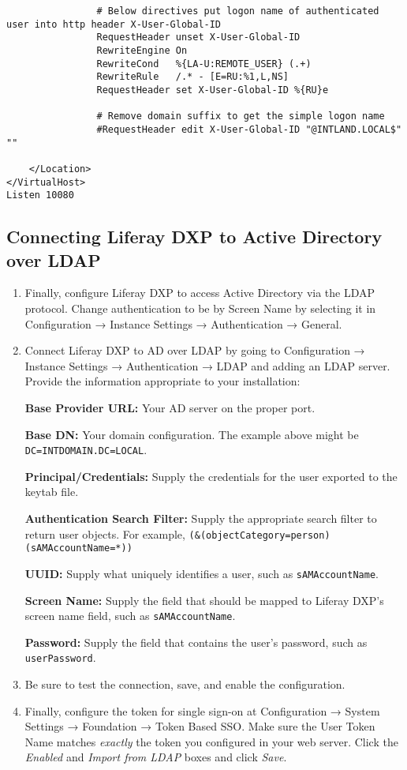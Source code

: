 \begin{enumerate}
\begin{verbatim}
                # Below directives put logon name of authenticated user into http header X-User-Global-ID
                RequestHeader unset X-User-Global-ID
                RewriteEngine On
                RewriteCond   %{LA-U:REMOTE_USER} (.+)
                RewriteRule   /.* - [E=RU:%1,L,NS]
                RequestHeader set X-User-Global-ID %{RU}e

                # Remove domain suffix to get the simple logon name
                #RequestHeader edit X-User-Global-ID "@INTLAND.LOCAL$" ""

    </Location>
</VirtualHost>
Listen 10080
\end{verbatim}
\end{enumerate}

\subsection{Connecting Liferay DXP to Active Directory over
LDAP}\label{connecting-liferay-dxp-to-active-directory-over-ldap}

\begin{enumerate}
\def\labelenumi{\arabic{enumi}.}
\item
  Finally, configure Liferay DXP to access Active Directory via the LDAP
  protocol. Change authentication to be by Screen Name by selecting it
  in Configuration → Instance Settings → Authentication → General.
\item
  Connect Liferay DXP to AD over LDAP by going to Configuration →
  Instance Settings → Authentication → LDAP and adding an LDAP server.
  Provide the information appropriate to your installation:

  \textbf{Base Provider URL:} Your AD server on the proper port.

  \textbf{Base DN:} Your domain configuration. The example above might
  be \texttt{DC=INTDOMAIN.DC=LOCAL}.

  \textbf{Principal/Credentials:} Supply the credentials for the user
  exported to the keytab file.

  \textbf{Authentication Search Filter:} Supply the appropriate search
  filter to return user objects. For example,
  \texttt{(\&(objectCategory=person)(sAMAccountName=*))}

  \textbf{UUID:} Supply what uniquely identifies a user, such as
  \texttt{sAMAccountName}.

  \textbf{Screen Name:} Supply the field that should be mapped to
  Liferay DXP's screen name field, such as \texttt{sAMAccountName}.

  \textbf{Password:} Supply the field that contains the user's password,
  such as \texttt{userPassword}.
\item
  Be sure to test the connection, save, and enable the configuration.
\item
  Finally, configure the token for single sign-on at Configuration →
  System Settings → Foundation → Token Based SSO. Make sure the User
  Token Name matches \emph{exactly} the token you configured in your web
  server. Click the \emph{Enabled} and \emph{Import from LDAP} boxes and
  click \emph{Save}.
\end{enumerate}

